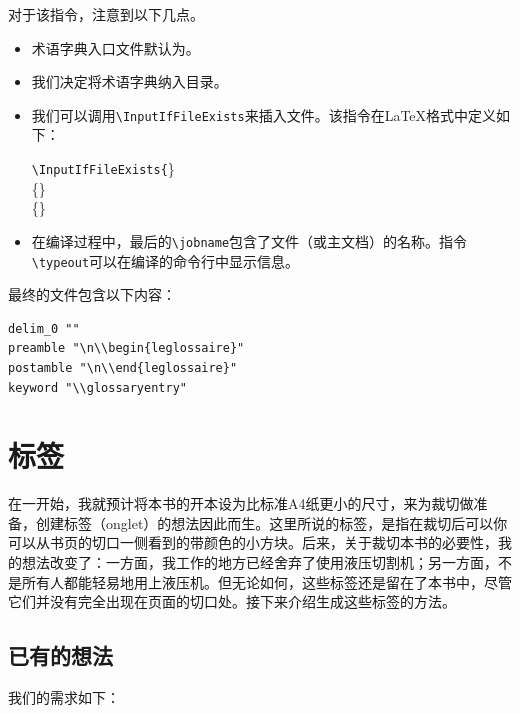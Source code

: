 对于该指令，注意到以下几点。

\begin{itemize}
    \item 术语字典入口文件默认为。
    \item 我们决定将术语字典纳入目录。
    \item 我们可以调用\verb|\InputIfFileExists|来插入文件。该指令在\LaTeX 格式中定义如下：
    
    \begin{dmd}
    \verb|\InputIfFileExists{|\}\\
    \{\}\\
    \{\}
    \end{dmd}

    \item 在编译过程中，最后的\verb|\jobname|包含了文件（或主文档）的名称。指令\verb|\typeout|可以在编译的命令行中显示信息。
\end{itemize}

最终的文件包含以下内容：

\begin{dmd}
\begin{verbatim}
delim_0 ""
preamble "\n\\begin{leglossaire}"
postamble "\n\\end{leglossaire}"
keyword "\\glossaryentry"\end{verbatim}
\end{dmd}

\section{标签}

在一开始，我就预计将本书的开本设为比标准A4纸更小的尺寸，来为裁切做准备，创建标签（onglet）的想法因此而生。这里所说的标签，是指在裁切后可以你可以从书页的切口一侧看到的带颜色的小方块。后来，关于裁切本书的必要性，我的想法改变了：一方面，我工作的地方已经舍弃了使用液压切割机；另一方面，不是所有人都能轻易地用上液压机。但无论如何，这些标签还是留在了本书中，尽管它们并没有完全出现在页面的切口处。接下来介绍生成这些标签的方法。

\subsection{已有的想法}

我们的需求如下：

